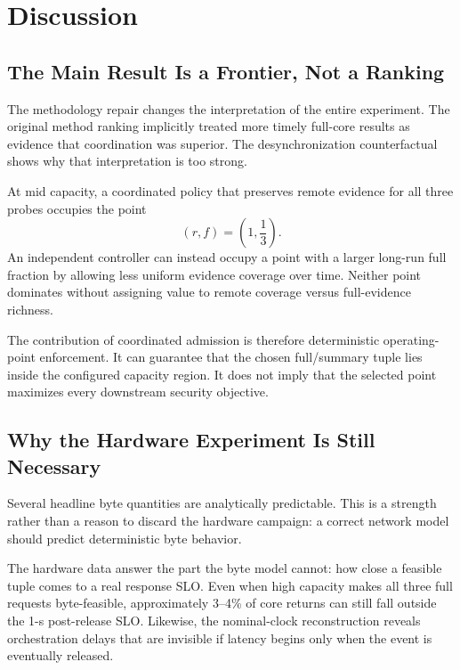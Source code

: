 \documentclass[10pt,journal]{IEEEtran}
\begin{document}
\section{Discussion}
\label{sec:discussion}

\subsection{The Main Result Is a Frontier, Not a Ranking}

The methodology repair changes the interpretation of the entire
experiment. The original method ranking implicitly treated more timely
full-core results as evidence that coordination was superior. The
desynchronization counterfactual shows why that interpretation is too
strong.

At mid capacity, a coordinated policy that preserves remote evidence
for all three probes occupies the point
\[
(r,f)=\left(1,\frac13\right).
\]
An independent controller can instead occupy a point with a larger
long-run full fraction by allowing less uniform evidence coverage over
time. Neither point dominates without assigning value to remote coverage
versus full-evidence richness.

The contribution of coordinated admission is therefore deterministic
operating-point enforcement. It can guarantee that the chosen
full/summary tuple lies inside the configured capacity region. It does
not imply that the selected point maximizes every downstream security
objective.

\subsection{Why the Hardware Experiment Is Still Necessary}

Several headline byte quantities are analytically predictable. This is
a strength rather than a reason to discard the hardware campaign:
a correct network model should predict deterministic byte behavior.

The hardware data answer the part the byte model cannot:
how close a feasible tuple comes to a real response SLO. Even when
high capacity makes all three full requests byte-feasible, approximately
3--4\% of core returns can still fall outside the 1-s post-release SLO.
Likewise, the nominal-clock reconstruction reveals orchestration delays
that are invisible if latency begins only when the event is eventually
released.
\end{document}
